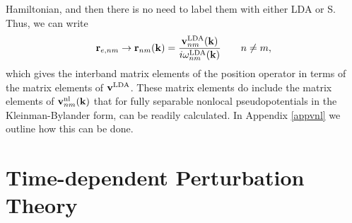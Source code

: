 \documentclass[floatfix,prb,aps,superscriptaddress,11pt,preprint]{revtex4}
\begin{document}
Hamiltonian, and then there is no need to label them with either LDA
or S. Thus,
we can write
\begin{equation}\label{chon.98}
\mathbf{r}_{e,nm}\to
\mathbf{r}_{nm}(\mathbf{k})=\frac{\mathbf{v}^{\mathrm{LDA}}_{nm}(\mathbf{k})}{i\omega^{\mathrm{LDA}}_{nm}(\mathbf{k})}
\quad\quad n\ne m
,
\end{equation}   
which gives the interband matrix elements of the position operator
in terms of the matrix elements of $\mathbf{v}^{\mathrm{LDA}}$. 
These matrix elements do include the matrix elements of
$\mathbf{v}^{\mathrm{nl}}_{nm}(\mathbf{k})$ that
for fully  separable nonlocal pseudopotentials in the 
Kleinman-Bylander 
form,\cite{motta_implementation_2010,kleinman_efficacious_1982,adolph_nonlocality_1996}
can be readily calculated.\cite{francesco}
In Appendix \ref{appvnl} we outline how this  
can be done. 



\section{Time-dependent Perturbation Theory}\label{tdpt}
\end{document}
